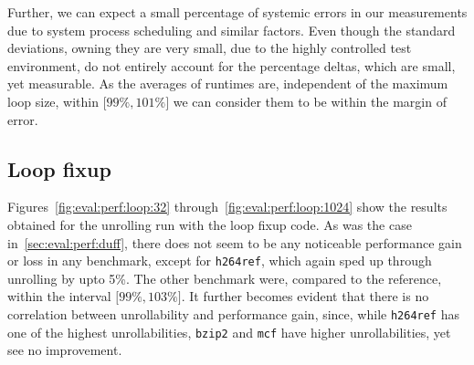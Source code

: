 Further, we can expect a small percentage of systemic errors in our measurements due to system process scheduling and similar factors.
Even though the standard deviations, owning they are very small, due to the highly controlled test environment, do not entirely account for the percentage deltas, which are small, yet measurable.
As the averages of runtimes are, independent of the maximum loop size, within $\lbrack 99\%, 101\% \rbrack$ we can consider them to be within the margin of error.

\subsection{Loop fixup}\label{sec:eval:perf:loop}

Figures~\ref{fig:eval:perf:loop:32} through~\ref{fig:eval:perf:loop:1024} show the results obtained for the unrolling run with the loop fixup code.
As was the case in~\cref{sec:eval:perf:duff}, there does not seem to be any noticeable performance gain or loss in any benchmark, except for \texttt{h264ref}, which again sped up through unrolling by upto 5\%.
The other benchmark were, compared to the reference, within the interval $\lbrack 99\%, 103\% \rbrack$.
It further becomes evident that there is no correlation between unrollability and performance gain, since, while \texttt{h264ref} has one of the highest unrollabilities, \texttt{bzip2} and \texttt{mcf} have higher unrollabilities, yet see no improvement.




